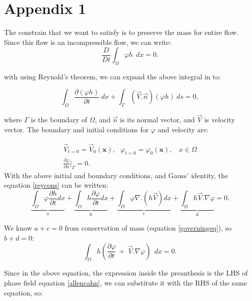 \documentclass[letterpaper,10pt]{article}
\begin{document}
\newpage
\appendix
\section{Appendix 1} \label{app1}

The constrain that we want to satisfy is to preserve the mass for entire flow. Since this flow is an incompressible flow, we can write:
\begin{equation} 
	\frac{D}{Dt} \int_\Omega \varphi h \ \ dx= 0.
\end{equation}

with using Reynold's theorem, we can expand the above integral in to:

\begin{equation} \label{reycons}
	\int_\Omega \frac{\partial (\varphi h)}{\partial t} \ dx + \int_\Gamma (\overrightarrow{V}.\overrightarrow{n}) (\varphi h)\  ds = 0,
\end{equation}

where $ \Gamma $ is the boundary of $\Omega$, and $\overrightarrow{n}$ is its normal vector, and $\overrightarrow{V}$ is velocity vector. The boundary and initial conditions for $\varphi$ and velocity are:

\begin{gather*} 
	\overrightarrow{V}_{t=0}=\overrightarrow{V}_0(\textbf{x}), \ \ \ 
	\varphi_{t=0}=\varphi_0(\textbf{x}), \ \ \ \ x\in \Omega \\
	\frac{\partial \varphi}{\partial n}\vert_{\Gamma} = 0.
\end{gather*}
With the above initial and boundary conditions, and Gauss' identity, the equation \eqref{reycons} can be written:
\begin{equation}
	\label{expand}
	\underbrace{\int_\Omega \varphi \frac{\partial h}{\partial t} dx}_\text{a} + 
	\underbrace{\int_\Omega h \frac{\partial \varphi}{\partial t} dx}_\text{b} +
	\underbrace{\int_\Omega \varphi \nabla.(h\overrightarrow{V}) dx}_\text{c} +
	\underbrace{\int_\Omega h\overrightarrow{V}.\nabla \varphi }_\text{d}
	= 0.
\end{equation}

We know $a+c=0$ from conservation of mass (equation \eqref{governingeq}), so   $b+d=0$:
\begin{equation}
	\label{expand1}
	\int_\Omega h (\frac{\partial \varphi}{\partial t} \  + \
	\overrightarrow{V}.\nabla \varphi) \ \ dx = 0.
\end{equation}

Since in the above equation, the expression inside the preanthesis is the LHS of phase field equation \eqref{allencahn}, we can substitute it with the RHS of the same equation, so:
\end{document}
